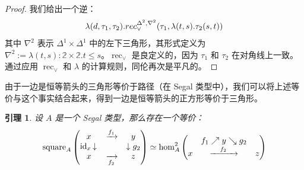 \documentclass{ctexrep}
\theoremstyle{plain}
\newtheorem{lemma}[theorem]{引理}
\theoremstyle{definition}
\theoremstyle{remark}
\theoremstyle{definition}
\theoremstyle{definition}
\theoremstyle{definition}
\newcommand{\coloneqq}{\mathrel{:=}}
\newcommand{\rec}{\operatorname{rec}}
\begin{document}
\begin{proof}
我们给出一个逆：
\[
\lambda(d,\tau_1,\tau_2).\\rec_{\lor}^{\Delta^2,\nabla^2}(\tau_1,\lambda(t,s).\tau_2(s,t))
\]
其中 $\nabla^2$ 表示 $\Delta^1\times\Delta^1$ 中的左下三角形，其形式定义为 $\nabla^2 \coloneqq \lambda(t,s):\mathbb{2}\times\mathbb{2}. t\leq s$。$\rec_{\lor}$ 是良定义的，因为 $\tau_1$ 和 $\tau_2$ 在对角线上一致。通过应用 $\rec_{\lor}$ 和 $\lambda$ 的计算规则，同伦再次是平凡的。
\end{proof}

由于一边是恒等箭头的三角形等价于路径（在 Segal 类型中），我们可以将上述等价与这个事实结合起来，得到一边是恒等箭头的正方形等价于三角形。

\begin{lemma}
设 $A$ 是一个 Segal 类型，那么存在一个等价：
\[
\text{square}_A \left( 
\begin{matrix} 
x & \xrightarrow{f_1} & y \\ 
\text{id}_x \left\downarrow \rule{0pt}{1.5ex} \right. & & \left\downarrow \rule{0pt}{1.5ex} \right. g_2 \\ 
x & \xrightarrow[f_2]{} & z 
\end{matrix} 
\right) \simeq \text{hom}_A^2 \left( \begin{matrix} & f_1 \nearrow y \searrow g_2 & \\ x & \xrightarrow{\quad f_2 \quad} & z \end{matrix} \right)
\]
\end{lemma}
\end{document}
